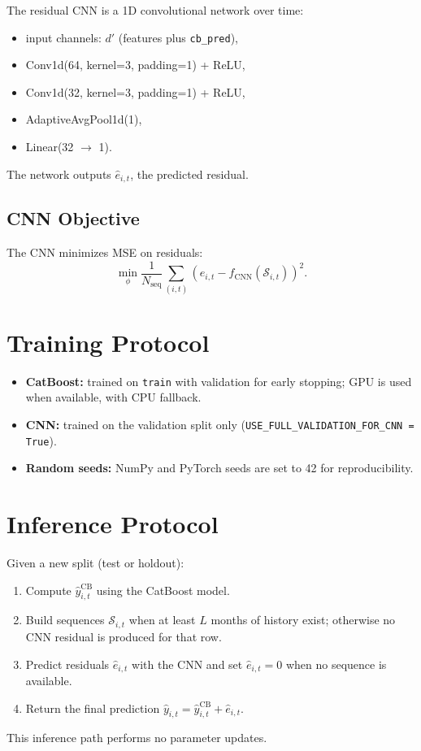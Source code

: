\documentclass[11pt]{article}
\begin{document}
The residual CNN is a 1D convolutional network over time:
\begin{itemize}
	\item input channels: $d'$ (features plus \texttt{cb\_pred}),
	\item Conv1d(64, kernel=3, padding=1) + ReLU,
	\item Conv1d(32, kernel=3, padding=1) + ReLU,
	\item AdaptiveAvgPool1d(1),
	\item Linear(32 $\to$ 1).
\end{itemize}
The network outputs $\hat{e}_{i,t}$, the predicted residual.

\subsection{CNN Objective}

The CNN minimizes MSE on residuals:
\[
\min_{\phi} \frac{1}{N_{\text{seq}}} \sum_{(i,t)}
\left(e_{i,t} - f_{\text{CNN}}(\mathcal{S}_{i,t})\right)^2.
\]

\section{Training Protocol}

\begin{itemize}
	\item \textbf{CatBoost:} trained on \texttt{train} with validation for early
	stopping; GPU is used when available, with CPU fallback.
	\item \textbf{CNN:} trained on the validation split only
	(\texttt{USE\_FULL\_VALIDATION\_FOR\_CNN = True}).
	\item \textbf{Random seeds:} NumPy and PyTorch seeds are set to 42 for
	reproducibility.
\end{itemize}

\section{Inference Protocol}

Given a new split (test or holdout):
\begin{enumerate}
	\item Compute $\hat{y}^{\text{CB}}_{i,t}$ using the CatBoost model.
	\item Build sequences $\mathcal{S}_{i,t}$ when at least $L$ months of
	history exist; otherwise no CNN residual is produced for that row.
	\item Predict residuals $\hat{e}_{i,t}$ with the CNN and set
	$\hat{e}_{i,t}=0$ when no sequence is available.
	\item Return the final prediction
	$\hat{y}_{i,t} = \hat{y}^{\text{CB}}_{i,t} + \hat{e}_{i,t}$.
\end{enumerate}
This inference path performs no parameter updates.
\end{document}
